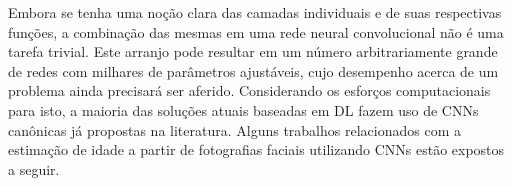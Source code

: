 
Embora se tenha uma noção clara das camadas individuais e de suas respectivas funções, a combinação das mesmas em uma rede neural convolucional não é uma tarefa trivial. Este arranjo pode resultar em um número arbitrariamente grande de redes com milhares de parâmetros ajustáveis, cujo desempenho acerca de um problema ainda precisará ser aferido. Considerando os esforços computacionais para isto, a maioria das soluções atuais baseadas em DL fazem uso de CNNs canônicas já propostas na literatura. Alguns trabalhos relacionados com a estimação de idade a partir de fotografias faciais utilizando CNNs estão expostos a seguir.
